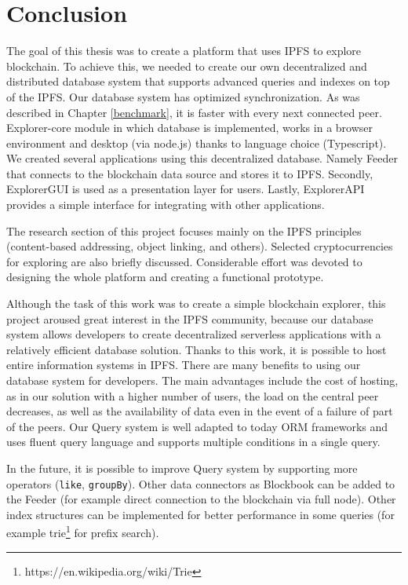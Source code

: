 \chapter{Conclusion}
\label{Conclusion}
The goal of this thesis was to create a platform that uses IPFS to explore blockchain. To achieve this, we needed to create our own decentralized and distributed database system that supports advanced queries and indexes on top of the IPFS. Our database system has optimized synchronization. As was described in Chapter \ref{benchmark}, it is faster with every next connected peer. Explorer-core module in which database is implemented, works in a browser environment and desktop (via node.js) thanks to language choice (Typescript). We created several applications using this decentralized database. Namely Feeder that connects to the blockchain data source and stores it to IPFS. Secondly, ExplorerGUI is used as a presentation layer for users. Lastly, ExplorerAPI provides a simple interface for integrating with other applications.

The research section of this project focuses mainly on the IPFS principles (content-based addressing, object linking, and others). Selected cryptocurrencies for exploring are also briefly discussed. Considerable effort was devoted to designing the whole platform and creating a functional prototype.

Although the task of this work was to create a simple blockchain explorer, this project aroused great interest in the IPFS community, because our database system allows developers to create decentralized serverless applications with a relatively efficient database solution. Thanks to this work, it is possible to host entire information systems in IPFS. There are many benefits to using our database system for developers. The main advantages include the cost of hosting, as in our solution with a higher number of users, the load on the central peer decreases, as well as the availability of data even in the event of a failure of part of the peers. Our Query system is well adapted to today ORM frameworks and uses fluent query language and supports multiple conditions in a single query. 

In the future, it is possible to improve Query system by supporting more operators (\texttt{like}, \texttt{groupBy}). Other data connectors as Blockbook can be added to the Feeder (for example direct connection to the blockchain via full node). Other index structures can be implemented for better performance in some queries (for example trie\footnote{https://en.wikipedia.org/wiki/Trie} for prefix search).



 
